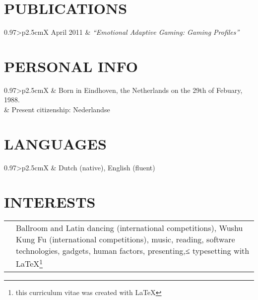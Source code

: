 \documentclass[a4paper, article, 10pt]{memoir}                                  %
\newcommand{\heading}[2]{                                                       %
    \section{
        {\fontsize{18}{\lineskip}\textbf{#1}}{\fontsize{12}{\lineskip}\textbf{#2}}}
        }
\begin{document}
    \heading{P}{UBLICATIONS}
    \begin{tabularx}{0.97\linewidth}{>{\raggedleft\scshape}p{2.5cm}X}
          April 2011 & \emph{``Emotional Adaptive Gaming: Gaming Profiles''} \\[.5ex]
    \end{tabularx}
    
    
    \section{{\fontsize{18}{\lineskip}\textbf{P}}{\fontsize{12}{\lineskip}\textbf{ERSONAL}} {\fontsize{18}{\lineskip}\textbf{I}}{\fontsize{12}{\lineskip}\textbf{NFO}}}
    \begin{tabularx}{0.97\linewidth}{>{\raggedleft\scshape}p{2.5cm}X}
           & Born in Eindhoven, the Netherlands on the 29th of Febuary, 1988.\\
           & Present citizenship: Nederlandse
    \end{tabularx}
    
    
    \heading{L}{ANGUAGES}
    \begin{tabularx}{0.97\linewidth}{>{\raggedleft\scshape}p{2.5cm}X}
          & Dutch (native), English (fluent)
    \end{tabularx}
    
    
    \heading{I}{NTERESTS}
    \begin{tabularx}{0.97\linewidth}{>{\raggedleft\scshape}p{2.5cm}X}
          & Ballroom and Latin dancing (international competitions), Wushu Kung Fu (international competitions), music, reading, software technologies, gadgets, human factors, presenting,≤ typesetting with \LaTeX\footnote{this curriculum vitae was created with \LaTeX}
    \end{tabularx}
    
\end{document}

